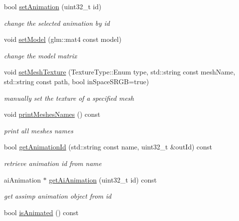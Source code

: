 \begin{DoxyCompactItemize}
bool \hyperlink{class_open_g_l_model_ae9e75f314d96a3e87fe4028fe7b1d73e}{set\+Animation} (uint32\+\_\+t id)
\begin{DoxyCompactList}\small\item\em change the selected animation by id \end{DoxyCompactList}\item 
void \hyperlink{class_open_g_l_model_ab8b43f89c8e315663ef603081c5d7199}{set\+Model} (glm\+::mat4 const model)
\begin{DoxyCompactList}\small\item\em change the model matrix \end{DoxyCompactList}\item 
void \hyperlink{class_open_g_l_model_a5a674e6563f21db429465ae79f8865d3}{set\+Mesh\+Texture} (Texture\+Type\+::\+Enum type, std\+::string const mesh\+Name, std\+::string const path, bool in\+Space\+S\+R\+GB=true)
\begin{DoxyCompactList}\small\item\em manually set the texture of a specified mesh \end{DoxyCompactList}\item 
\mbox{\label{class_open_g_l_model_aac56ee9a8e71cd2ccf1c5026b798c2e6}} 
void \hyperlink{class_open_g_l_model_aac56ee9a8e71cd2ccf1c5026b798c2e6}{print\+Meshes\+Names} () const
\begin{DoxyCompactList}\small\item\em print all meshes names \end{DoxyCompactList}\item 
bool \hyperlink{class_open_g_l_model_a0865d7d0a93f9972a99dc0a60ad142db}{get\+Animation\+Id} (std\+::string const name, uint32\+\_\+t \&out\+Id) const
\begin{DoxyCompactList}\small\item\em retrieve animation id from name \end{DoxyCompactList}\item 
ai\+Animation $\ast$ \hyperlink{class_open_g_l_model_a48c2e9945d15e917388165bd5fc92dd8}{get\+Ai\+Animation} (uint32\+\_\+t id) const
\begin{DoxyCompactList}\small\item\em get assimp animation object from id \end{DoxyCompactList}\item 
bool \hyperlink{class_open_g_l_model_abafc4c5a2350939ab5d70bf3cebd11d5}{is\+Animated} () const

\end{DoxyCompactItemize}
